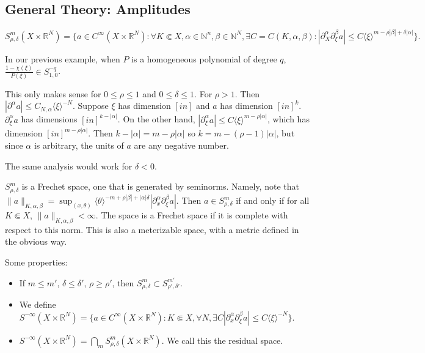 \documentclass[12pt]{scrartcl}
\newcommand{\N}{\mathbb{N}}
\newcommand{\R}{\mathbb{R}}
\newcommand{\<}{\langle}
\renewcommand{\>}{\rangle}
\begin{document}
\subsection{General Theory: Amplitudes}
\begin{definition} $S_{\rho, \delta}^m(X \times \R^{N}) = \{a \in C^\infty(X \times \R^N) : \forall K \Subset X, \alpha \in \N^n, \beta \in \N^N, \exists C = C(K, \alpha, \beta) : |\partial_X^\alpha \partial_{\xi}^\beta a| \le C\<\xi\>^{m - \rho|\beta| + \delta|\alpha|}\}.$  
\end{definition}
In our previous example, when $P$ is a homogeneous polynomial of degree $q$, $\frac{1 - \chi(\xi)}{P(\xi)} \in S_{1, 0}^{-q}$.
\begin{remark} This only makes sense for $0 \le \rho \le 1$ and $0 \le \delta \le 1$.  For $\rho > 1$.  Then $|\partial^\alpha a| \le C_{N, \alpha} \<\xi\>^{-N}$.  Suppose $\xi$ has dimension $[in]$ and $a$ has dimension $[in]^k$.  $\partial_\xi^\alpha a$ has dimensions $[in]^{k - |\alpha|}$.  On the other hand, $|\partial_{\xi}^\alpha a| \le C\<\xi\>^{m - \rho |\alpha|}$, which has dimension $[in]^{m - \rho |\alpha|}$.  Then $k - |\alpha| = m - \rho|\alpha|$ so $k = m - (\rho - 1)|\alpha|$, but since $\alpha$ is arbitrary, the units of $a$ are any negative number.  

The same analysis would work for $\delta < 0$.
\end{remark}

$S_{\rho, \delta}^m$ is a Frechet space, one that is generated by seminorms.  Namely, note that $\|a\|_{K, \alpha, \beta} = \sup_{(x, \theta)} \<\theta\>^{-m + \rho |\beta| + |\alpha| \delta}|\partial_x^\alpha \partial_\xi^\beta a|$.  Then $a \in S_{\rho, \delta}^m$ if and only if for all $K \Subset X$, $\|a\|_{K, \alpha, \beta}< \infty$.    The space is a Frechet space if it is complete with respect to this norm.  This is also a meterizable space, with a metric defined in the obvious way.  

Some properties:
\begin{itemize}
\item If $m \le m'$, $\delta \le \delta'$, $\rho \ge \rho'$, then $S_{\rho, \delta}^m \subset S_{\rho', \delta'}^{m'}$.
\item We define $S^{-\infty}(X \times \R^N) = \{a \in C^\infty(X \times \R^N) : K \Subset X, \forall N, \exists C |\partial_x^\alpha \partial_{\xi}^\beta a| \le C\<\xi\>^{-N}\}$.
\item $S^{-\infty}(X \times \R^N) = \bigcap_{m} S_{\rho, \delta}^m (X \times \R^N)$.  We call this the residual space.  
\end{itemize}
\end{document}
